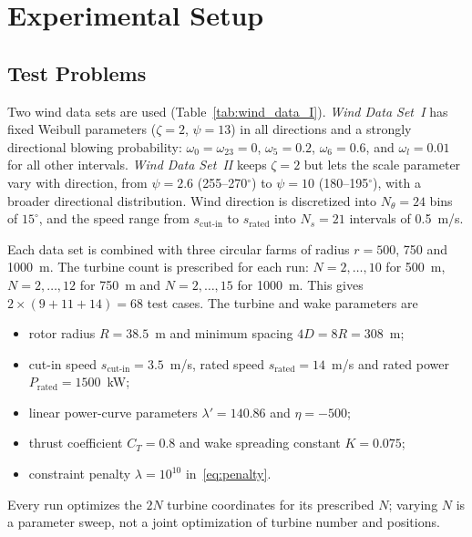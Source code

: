 \section{Experimental Setup}
\label{sec:setup}

\subsection{Test Problems}
Two wind data sets are used (Table~\ref{tab:wind_data_I}). \emph{Wind Data Set~I} has fixed Weibull parameters ($\zeta=2$, $\psi=13$) in all directions and a strongly directional blowing probability: $\omega_0=\omega_{23}=0$, $\omega_5=0.2$, $\omega_6=0.6$, and $\omega_l=0.01$ for all other intervals. \emph{Wind Data Set~II} keeps $\zeta=2$ but lets the scale parameter vary with direction, from $\psi=2.6$ (255--270$^\circ$) to $\psi=10$ (180--195$^\circ$), with a broader directional distribution. Wind direction is discretized into $N_\theta=24$ bins of $15^\circ$, and the speed range from $s_{\text{cut-in}}$ to $s_{\text{rated}}$ into $N_s=21$ intervals of 0.5~m/s.

Each data set is combined with three circular farms of radius $r=500$, 750 and 1000~m. The turbine count is prescribed for each run: $N=2,\ldots,10$ for 500~m, $N=2,\ldots,12$ for 750~m and $N=2,\ldots,15$ for 1000~m. This gives $2\times(9+11+14)=68$ test cases. The turbine and wake parameters are
\begin{itemize}
    \item rotor radius $R=38.5$~m and minimum spacing $4D=8R=308$~m;
    \item cut-in speed $s_{\text{cut-in}}=3.5$~m/s, rated speed $s_{\text{rated}}=14$~m/s and rated power $P_{\text{rated}}=1500$~kW;
    \item linear power-curve parameters $\lambda'=140.86$ and $\eta=-500$;
    \item thrust coefficient $C_T=0.8$ and wake spreading constant $K=0.075$;
    \item constraint penalty $\lambda=10^{10}$ in~\eqref{eq:penalty}.
\end{itemize}
Every run optimizes the $2N$ turbine coordinates for its prescribed $N$; varying $N$ is a parameter sweep, not a joint optimization of turbine number and positions.


